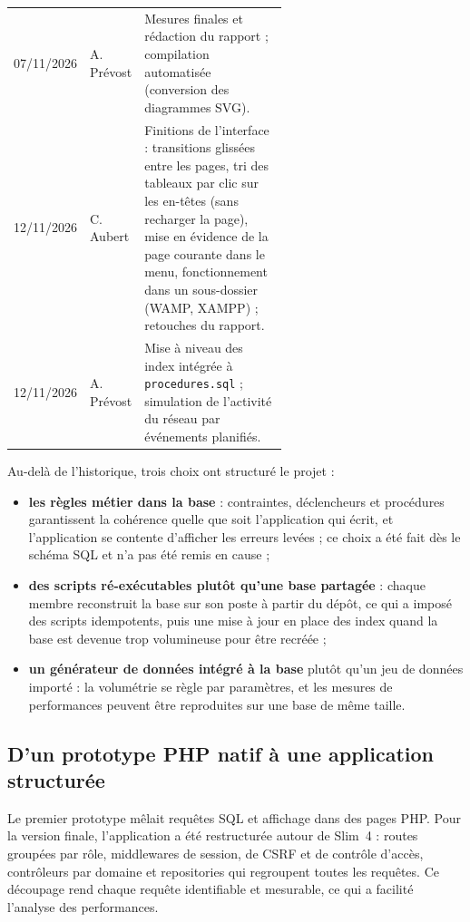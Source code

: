 {\begin{longtable}{l l >{\raggedright\arraybackslash}p{0.6\linewidth}}
	07/11/2026 & A. Prévost & Mesures finales et rédaction du rapport ; compilation automatisée (conversion des diagrammes SVG). \\
	12/11/2026 & C. Aubert & Finitions de l'interface : transitions glissées entre les pages, tri des tableaux par clic sur les en-têtes (sans recharger la page), mise en évidence de la page courante dans le menu, fonctionnement dans un sous-dossier (WAMP, XAMPP) ; retouches du rapport. \\
	12/11/2026 & A. Prévost & Mise à niveau des index intégrée à \texttt{procedures.sql} ; simulation de l'activité du réseau par événements planifiés. \\
\end{longtable}
}

Au-delà de l'historique, trois choix ont structuré le projet :
\begin{itemize}
	\item \textbf{les règles métier dans la base} : contraintes, déclencheurs et procédures garantissent la cohérence quelle que soit l'application qui écrit, et l'application se contente d'afficher les erreurs levées ; ce choix a été fait dès le schéma SQL et n'a pas été remis en cause ;
	\item \textbf{des scripts ré-exécutables plutôt qu'une base partagée} : chaque membre reconstruit la base sur son poste à partir du dépôt, ce qui a imposé des scripts idempotents, puis une mise à jour en place des index quand la base est devenue trop volumineuse pour être recréée ;
	\item \textbf{un générateur de données intégré à la base} plutôt qu'un jeu de données importé : la volumétrie se règle par paramètres, et les mesures de performances peuvent être reproduites sur une base de même taille.
\end{itemize}

\subsection{D'un prototype PHP natif à une application structurée}

Le premier prototype mêlait requêtes SQL et affichage dans des pages PHP. Pour la version finale, l'application a été restructurée autour de Slim~4 : routes groupées par rôle, middlewares de session, de CSRF et de contrôle d'accès, contrôleurs par domaine et repositories qui regroupent toutes les requêtes. Ce découpage rend chaque requête identifiable et mesurable, ce qui a facilité l'analyse des performances.

